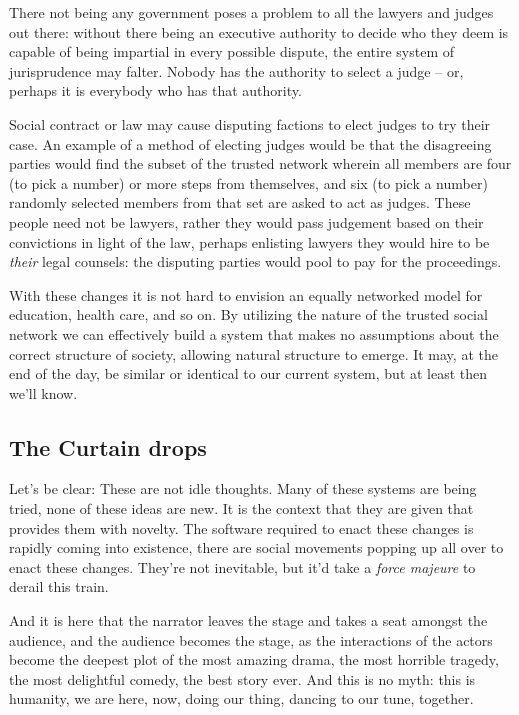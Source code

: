 There not being any government poses a problem to all the lawyers and judges 
out there: without there being an executive authority to decide who they deem 
is capable of being impartial in every possible dispute, the entire system of
jurisprudence may falter. Nobody has the authority to select a judge – or,
perhaps it is everybody who has that authority.

Social contract or law may cause disputing factions to elect judges to try 
their case. An example of a method of electing judges would be that the
disagreeing parties would f\hbox{}ind the subset of the trusted network wherein
all members are four (to pick a number) or more steps from themselves, and six
(to pick a number) randomly selected members from that set are asked to act as
judges.  These people need not be lawyers, rather they would pass judgement
based on their convictions in light of the law, perhaps enlisting lawyers they
would hire to be \textit{their} legal counsels: the disputing parties would 
pool to pay for the proceedings.

With these changes it is not hard to envision an equally networked model for
education, health care, and so on. By utilizing the nature of the trusted 
social network we can ef\hbox{}fectively build a system that makes no
assumptions about the correct structure of society, allowing natural structure
to emerge. It may, at the end of the day, be similar or identical to our 
current system, but at least then we'll know.


\subsection{The Curtain drops}
\label{s:artificial_scarcity:five_steps:curtain}

Let's be clear: These are not idle thoughts. Many of these systems are being
tried, none of these ideas are new. It is the context that they are given that
provides them with novelty. The software required to enact these changes is
rapidly coming into existence, there are social movements popping up all over 
to enact these changes. They're not inevitable, but it'd take a \textit{force
majeure} to derail this train.

And it is here that the narrator leaves the stage and takes a seat amongst the
audience, and the audience becomes the stage, as the interactions of the actors
become the deepest plot of the most amazing drama, the most horrible tragedy,
the most delightful comedy, the best story ever. And this is no myth: this is
humanity, we are here, now, doing our thing, dancing to our tune, together.

